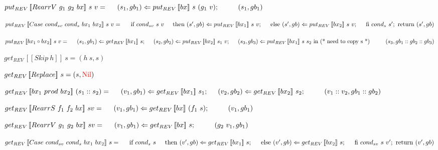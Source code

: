 \documentclass[runningheads]{llncs}
\newcommand{\tab}{\hspace*{5mm}}
\newcommand{\qtab}{\hspace*{5mm} \ \quad}
\newcommand{\product}[2]{#1 \ prod \ #2}
\newcommand{\rearrs}[3]{RearrS \ #1 \ #2 \ #3}
\newcommand{\rearrv}[3]{RearrV \ #1 \ #2 \ #3}
\newcommand{\casebx}[4]{Case \ #1 \ #2 \ #3 \ #4}
\newcommand{\putrev}[3]{put_{REV} \, [\![#1]\!] \ {#2} \ {#3}}
\newcommand{\getrev}[2]{get_{REV} \, [\![#1]\!] \ {#2}}
\begin{document}
$\putrev{\rearrv{g_1}{g_2}{bx}}{s}{v} =\\
    \tab (s_1, gb_1) \Leftarrow \putrev{bx}{s}{(g_1 \ v)};\\
        \qtab (s_1, gb_1)$

$\putrev{\casebx{cond_{sv}}{cond_{s}}{bx_1}{bx_2}}{s}{v} =\\
    \tab \text{if} \ cond_{sv} \ s \ v\\
    \tab \text{then} \ (s', gb) \Leftarrow \putrev{bx_1}{s}{v};\\
    \tab \text{else} \ (s', gb) \Leftarrow \putrev{bx_2}{s}{v};\\
    \tab \text{fi} \ cond_{s} \ s'; \ \text{return} \ (s', gb)$

$\putrev{bx_1 \circ bx_2}{s}{v} =\\
    \tab (s_1, gb_1) \Leftarrow \getrev{bx_1}{s};\\
    \tab (s_2, gb_2) \Leftarrow \putrev{bx_2}{s_1}{v};\\
    \tab (s_3, gb_3) \Leftarrow \putrev{bx_1}{s}{s_2} \ \text{in (* need to copy s *)}\\
        \qtab (s_3, gb_1 :: gb_2 :: gb_3)$

\vspace{5mm}

$\getrev{Skip \ h}{s} = {(h \ s, s)}$

$\getrev{Replace}{s} = (s, \textcolor{red}{\text{Nil}})$

$\getrev{\product{bx_1}{bx_2}}{(s_1 :: s_2)} = \\
    \tab (v_1, gb_1) \Leftarrow \getrev{bx_1}{s_1};\\
    \tab (v_2, gb_2) \Leftarrow \getrev{bx_2}{s_2};\\
        \qtab (v_1 :: v_2, gb_1 :: gb_2)$

$\getrev{\rearrs{f_1}{f_2}{bx}}{s}{v} =\\
    \tab (v_1, gb_1) \Leftarrow \getrev{bx}{(f_1 \ s)};\\
        \qtab (v_1, gb_1)$

$\getrev{\rearrv{g_1}{g_2}{bx}}{s}{v} =\\
    \tab (v_1, gb_1) \Leftarrow \getrev{bx}{s};\\
        \qtab (g_2 \ v_1, gb_1)$

$\getrev{\casebx{cond_{sv}}{cond_{s}}{bx_1}{bx_2}}{s} =\\
    \tab \text{if} \ cond_{s} \ s\\
    \tab \text{then} \ (v', gb) \Leftarrow \getrev{bx_1}{s};\\
    \tab \text{else} \ (v', gb) \Leftarrow \getrev{bx_2}{s};\\
    \tab \text{fi} \ cond_{sv} \ s \ v'; \ \text{return} \ (v', gb)$
\end{document}
